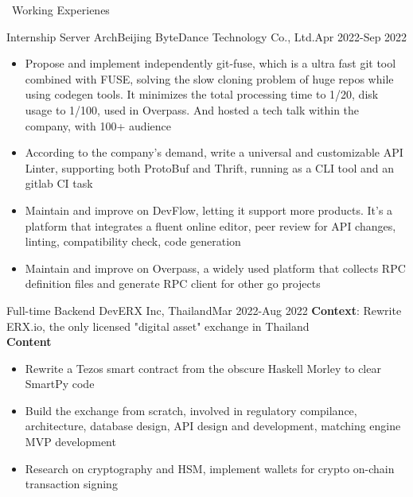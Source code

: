 \documentclass{resume}
\begin{document}
\begin{rSection}{\faUsers~Working Experienes}
    \begin{rExperience}{Internship Server Arch}{Beijing ByteDance Technology Co., Ltd.}{Apr 2022-Sep 2022}
        \begin{itemize}
            \itemsep -0.5em \vspace{-0.5em}
            \item Propose and implement independently git-fuse, which is a ultra fast git tool combined with FUSE, solving the slow cloning problem of huge repos while using codegen tools. It minimizes the total processing time to 1/20, disk usage to 1/100, used in Overpass. And hosted a tech talk within the company, with 100+ audience
            \item According to the company's demand, write a universal and customizable API Linter, supporting both ProtoBuf and Thrift, running as a CLI tool and an gitlab CI task
            \item Maintain and improve on DevFlow, letting it support more products. It's a platform that integrates a fluent online editor, peer review for API changes, linting, compatibility check, code generation
            \item Maintain and improve on Overpass, a widely used platform that collects RPC definition files and generate RPC client for other go projects
        \end{itemize}
    \end{rExperience}
    \begin{rExperience}{Full-time Backend Dev}{ERX Inc, Thailand}{Mar 2022-Aug 2022}
        \textbf{Context}:
        Rewrite ERX.io, the only licensed "digital asset" exchange in Thailand\\
        \textbf{Content}
        \begin{itemize}
            \itemsep -0.5em \vspace{-0.5em}
            \item Rewrite a Tezos smart contract from the obscure Haskell Morley to clear SmartPy code
            \item Build the exchange from scratch, involved in regulatory compilance, architecture, database design, API design and development, matching engine MVP development
            \item Research on cryptography and HSM, implement wallets for crypto on-chain transaction signing
        \end{itemize}
    \end{rExperience}

\end{rSection}
\end{document}
